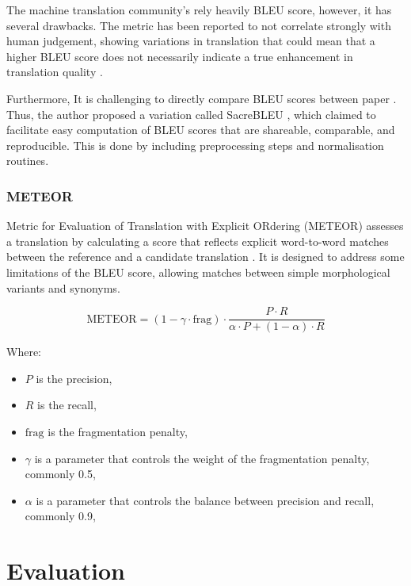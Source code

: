 \documentclass[a4paper]{article}
\begin{document}
The machine translation community's rely heavily BLEU score, however, it has several drawbacks. The metric has been reported to not correlate strongly with human judgement, showing variations in translation that could mean that a higher BLEU score does not necessarily indicate a true enhancement in translation quality \cite{callison-burch-2006-reevaluating-bleu}.

Furthermore, It is challenging to directly compare BLEU scores between paper \cite{post-2018-sacrebleu}. Thus, the author proposed a variation called SacreBLEU \cite{post-2018-sacrebleu}, which claimed to facilitate easy computation of BLEU scores that are shareable, comparable, and reproducible. This is done by including preprocessing steps and normalisation routines.


\subsubsection{METEOR}

Metric for Evaluation of Translation with Explicit ORdering (METEOR) \cite{lavie-2007-meteor} assesses a translation by calculating a score that reflects explicit word-to-word matches between the reference and a candidate translation \cite{agarwal-2008-meteor-mbleu-mter}. It is designed to address some limitations of the BLEU score, allowing matches between simple morphological variants and synonyms.

\begin{equation}
    \text{METEOR} = (1 - \gamma \cdot \text{frag}) \cdot \frac{P \cdot R}{\alpha \cdot P + (1 - \alpha) \cdot R}
\end{equation}

Where:
\begin{itemize}
    \item \(P\) is the precision,
    \item \(R\) is the recall,
    \item \(\text{frag}\) is the fragmentation penalty,
    \item \(\gamma\) is a parameter that controls the weight of the fragmentation penalty, commonly 0.5,
    \item \(\alpha\) is a parameter that controls the balance between precision and recall, commonly 0.9,
\end{itemize}


\section{Evaluation}
\end{document}
